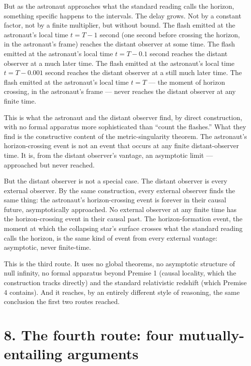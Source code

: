 \documentclass[11pt,a4paper]{article}
\begin{document}
But as the astronaut approaches what the standard reading calls the horizon, something specific happens to the intervals. The delay grows. Not by a constant factor, not by a finite multiplier, but without bound. The flash emitted at the astronaut's local time $t = T - 1$ second (one second before crossing the horizon, in the astronaut's frame) reaches the distant observer at some time. The flash emitted at the astronaut's local time $t = T - 0.1$ second reaches the distant observer at a much later time. The flash emitted at the astronaut's local time $t = T - 0.001$ second reaches the distant observer at a still much later time. The flash emitted at the astronaut's local time $t = T$ --- the moment of horizon crossing, in the astronaut's frame --- never reaches the distant observer at any finite time.

This is what the astronaut and the distant observer find, by direct construction, with no formal apparatus more sophisticated than ``count the flashes.'' What they find is the constructive content of the metric-singularity theorem. The astronaut's horizon-crossing event is not an event that occurs at any finite distant-observer time. It is, from the distant observer's vantage, an asymptotic limit --- approached but never reached.

But the distant observer is not a special case. The distant observer is every external observer. By the same construction, every external observer finds the same thing: the astronaut's horizon-crossing event is forever in their causal future, asymptotically approached. No external observer at any finite time has the horizon-crossing event in their causal past. The horizon-formation event, the moment at which the collapsing star's surface crosses what the standard reading calls the horizon, is the same kind of event from every external vantage: asymptotic, never finite-time.

This is the third route. It uses no global theorems, no asymptotic structure of null infinity, no formal apparatus beyond Premise 1 (causal locality, which the construction tracks directly) and the standard relativistic redshift (which Premise 4 contains). And it reaches, by an entirely different style of reasoning, the same conclusion the first two routes reached.

\section*{8. The fourth route: four mutually-entailing arguments}
\end{document}
